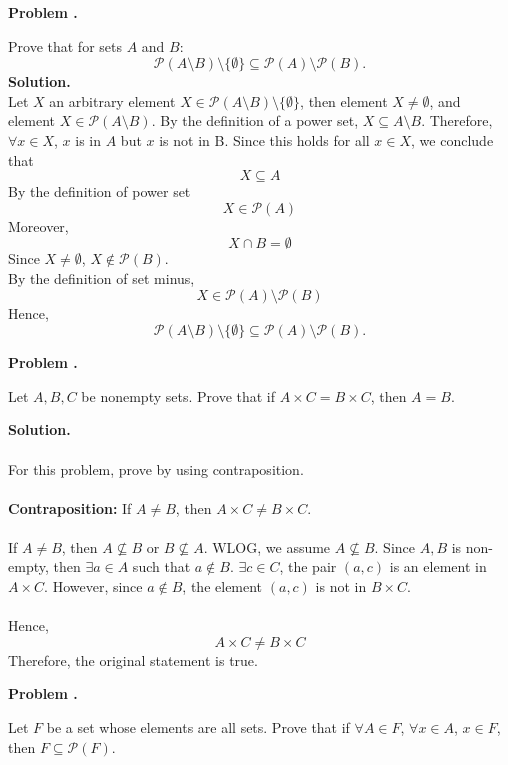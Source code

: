 \documentclass[12pt]{article}
\newcounter{HWcounter}
\newcommand{\problem}{\textbf{Problem  \theHWcounter.} \addtocounter{HWcounter}{1}}
\newcommand{\answer}{\vspace{2em} \textbf{Solution. }}
\begin{document}
\newpage
\problem Prove that for sets $A$ and $B$: 
\[ \mathscr{P}(A \setminus B) \setminus \{\emptyset\} \subseteq \mathscr{P}(A) \setminus \mathscr{P}(B) . \]
\answer  %
\\
Let $X$ an arbitrary element $X\in \mathscr{P}(A \setminus B) \setminus \{\emptyset\}$, then element $X \neq \emptyset$, and element $X\in \mathscr{P}(A \setminus B)$. By the definition of a power set, $X\subseteq A \setminus B $. Therefore, $\forall x \in X$, $x$ is in $A$ but $x$ is not in B. Since this holds for all $x \in X$, we conclude that
\[ X \subseteq A \]
By the definition of power set 
\[X\in  \mathscr{P}(A)\]
Moreover,
\[ X \cap B = \emptyset \]
Since $X \neq \emptyset$, $X \notin \mathscr{P}(B)$.\\
By the definition of set minus, 
\[ X \in \mathscr{P}(A) \setminus \mathscr{P}(B)\]
Hence, 
\[ \mathscr{P}(A \setminus B) \setminus \{\emptyset\} \subseteq \mathscr{P}(A) \setminus \mathscr{P}(B) . \]





\newpage
\problem Let $A,B,C$ be nonempty sets. Prove that if $A \times C = B \times C$, then $A = B$.

\answer\\  %
\\
For this problem, prove by using contraposition.\\
\\
\textbf{Contraposition: } If $A \neq B$, then $A \times C \neq B \times C$.\\
\\
If $A \neq B$, then $A\not\subseteq B$ or $B\not\subseteq A$. WLOG, we assume $A\not\subseteq B$. Since $A, B$ is non-empty, then $\exists a \in A$ such that $a \notin B$. $\exists c \in C$, the pair $(a,c)$ is an element in  $A \times C$. However, since  $a \notin B$, the element $(a,c)$ is not in $B \times C$. \\
\\
Hence,
\[A \times C \neq B \times C\]
Therefore, the original statement is true.









\newpage
\problem Let $F$ be a set whose elements are all sets. Prove that if $\forall A \in F$, $\forall x \in A$, $x \in F$, then $F \subseteq \mathscr{P}(F)$.
\end{document}
